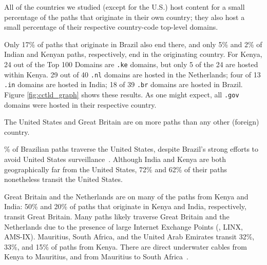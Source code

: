 
\begin{finding}
All of the countries we studied (except for the U.S.) host content for a small percentage of the paths that originate in their own country; they also host a small percentage of their respective country-code top-level domains.
\end{finding}
\noindent
Only 17\% of paths that originate in Brazil also end there, and only 5\%
and 2\% of Indian and Kenyan paths, respectively, end in the originating
country.  
For Kenya, 24 out of the Top 100 Domains are {\tt .ke} domains, but only 5
of the 24 are hosted within Kenya.  29 out of 40 {\tt .nl} domains are hosted in the Netherlands;
four of 13 {\tt .in} domains are hosted in India; 18 of 39 {\tt .br} domains are hosted in Brazil.  
Figure \ref{fig:cctld_graph} shows these results.  As one might expect, all {\tt .gov} domains were hosted in their respective country. 

\begin{finding}
The United States and Great Britain are on more paths than any other (foreign) country.
\end{finding}
\% of Brazilian paths traverse the United States, despite Brazil's
strong efforts to avoid United States surveillance~\cite{brazil_break_from_US,brazil_us_companies,brazil_conference,brazil_conference2,brazil_human_rights,brazil_cable}.  Although India and
Kenya are both geographically far from the United States, 72\% and 62\% of their
paths nonetheless transit
the United States.

Great Britain and the Netherlands are on 
many of the paths from Kenya and India:
50\% and 20\% of
paths that originate in Kenya and India, respectively, transit Great
Britain.   Many paths likely traverse Great Britain and the Netherlands due to
the presence of large Internet Exchange Points (\ie, LINX, AMS-IX).
Mauritius, South Africa, and the United Arab Emirates transit 32\%,
33\%, and 15\% of paths from Kenya.  There are direct underwater cables
from Kenya to Mauritius, and from Mauritius to South
Africa~\cite{cablemap}.



